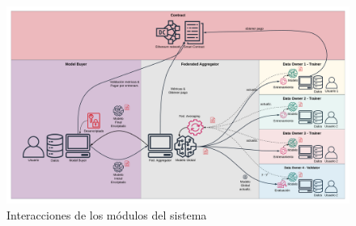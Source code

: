 \documentclass[
11pt, %
oneside, %
spanish, %
singlespacing, %
parskip, %
headsepline, %
chapterinoneline, %
]{MastersDoctoralThesis} %
\begin{document}
\begin{figure}[H]
  	\centering
	\includegraphics[scale=0.072]{imgs/deltaml_flow.png}
	\caption{Interacciones de los módulos del sistema}
	\label{fig:interact}
\end{figure}
\end{document}
